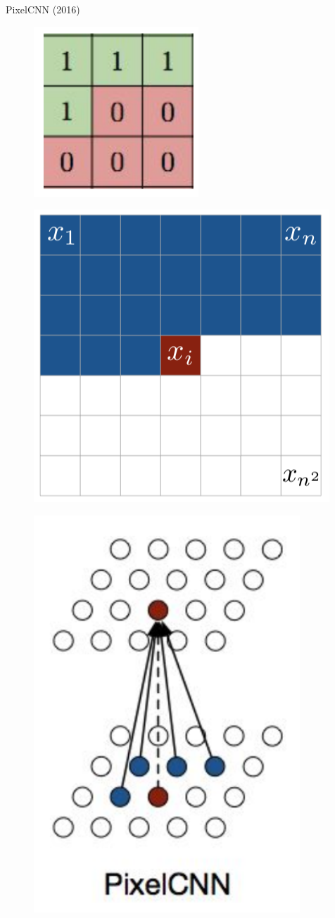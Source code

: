 \begin{frame}{PixelCNN (2016)}
\begin{minipage}[t]{0.5\columnwidth}
	\begin{figure}[h]
		\centering
        \includegraphics[width=0.35\linewidth]{figs/pixelcnn_0_1.png}
	\end{figure}
	\vspace{-0.1cm}
	\begin{figure}[h]
		\centering
        \includegraphics[width=0.7\linewidth]{figs/pixelcnn1.png}
	\end{figure}
	\end{minipage}%
	\begin{minipage}[t]{0.5\columnwidth}
	\begin{figure}[h]
		\centering
        \includegraphics[width=0.5\linewidth]{figs/pixelcnn_0_2.png}

\end{figure}
\end{minipage}
\end{frame}
